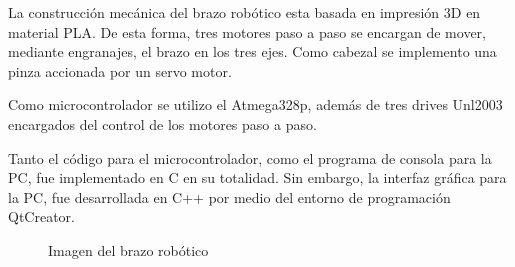 La construcción mecánica del brazo robótico esta basada en impresión 3D en material PLA.
De esta forma, tres motores paso a paso se encargan de mover, mediante  engranajes, el brazo
en los tres ejes. Como cabezal se implemento una pinza accionada por un servo motor.
\par
Como microcontrolador se utilizo el Atmega328p, además de tres drives Unl2003 encargados del control de los motores paso a paso.
\par
Tanto el código para el microcontrolador, como el programa de consola para la PC, fue implementado en C en su totalidad.
Sin embargo, la interfaz gráfica para la PC, fue desarrollada en C++ por medio del entorno de programación QtCreator.
\begin{figure}[!htb]
  \begin{center}
    \qquad
  \end{center}
  \caption{Imagen del brazo robótico}
  \label{fig:brazo}
\end{figure}
